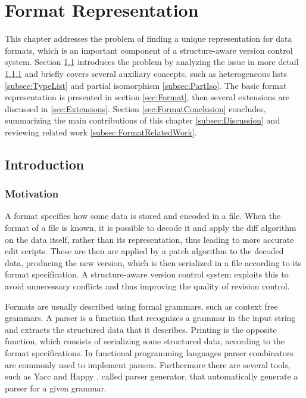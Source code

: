 \documentclass[../Thesis.tex]{subfiles}
\begin{document}
\chapter{Format Representation}
\label{chapter:FormatRepresentation}

This chapter addresses the problem of finding a unique representation for data formats, which is an
important component of a structure-aware version control 
system.
Section \ref{sec:FormatIntroduction} introduces the problem by  analyzing the issue in more detail \ref{subsec:FormatMotivation} and briefly covers several auxiliary concepts, such as heterogeneous lists \ref{subsec:TypeList} and partial isomorphism \ref{subsec:PartIso}.
The basic format representation is presented in section \ref{sec:Format}, 
then several extensions are discussed in \ref{sec:Extensions}.
Section \ref{sec:FormatConclusion} concludes, summarizing the main 
contributions of this chapter \ref{subsec:Discussion} 
and reviewing related work \ref{subsec:FormatRelatedWork}.

\section{Introduction}
\label{sec:FormatIntroduction} 
 
\subsection{Motivation}
\label{subsec:FormatMotivation}
A format specifies how some data is stored and encoded in a file.
When the format of a file is known, it is possible to decode it and apply the diff algorithm on the data itself, rather than its representation, thus leading to more accurate edit scripts. These are then are applied by a patch algorithm to the decoded data, producing the new version, which is then serialized in a file according to its format specification.
A structure-aware version control system exploits this to
avoid unnecessary conflicts and thus improving 
the quality of revision control.

Formats are usually described using formal grammars, such as context free grammars.
A parser is a function that recognizes a grammar in the input string and extracts the structured data that it describes.
Printing is the opposite function, which consists of serializing some structured data, according to the format specifications.
In functional programming languages parser combinators are commonly used to implement parsers.
Furthermore there are several tools, such as Yacc \cite{YACC} 
and Happy \cite{HAPPY}, called parser generator,
that automatically generate a parser for a given grammar. 
\end{document}
